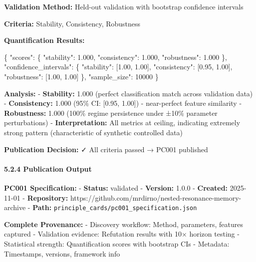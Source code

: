 \documentclass[
]{article}
\newenvironment{Shaded}{}{}
\newcommand{\DataTypeTok}[1]{\textcolor[rgb]{0.56,0.13,0.00}{#1}}
\newcommand{\DecValTok}[1]{\textcolor[rgb]{0.25,0.63,0.44}{#1}}
\newcommand{\FloatTok}[1]{\textcolor[rgb]{0.25,0.63,0.44}{#1}}
\newcommand{\FunctionTok}[1]{\textcolor[rgb]{0.02,0.16,0.49}{#1}}
\newcommand{\OtherTok}[1]{\textcolor[rgb]{0.00,0.44,0.13}{#1}}
\begin{document}
\textbf{Validation Method:} Held-out validation with bootstrap
confidence intervals

\textbf{Criteria:} Stability, Consistency, Robustness

\textbf{Quantification Results:}

\begin{Shaded}
\begin{Highlighting}[]
\FunctionTok{\{}
  \DataTypeTok{"scores"}\FunctionTok{:} \FunctionTok{\{}
    \DataTypeTok{"stability"}\FunctionTok{:} \FloatTok{1.000}\FunctionTok{,}
    \DataTypeTok{"consistency"}\FunctionTok{:} \FloatTok{1.000}\FunctionTok{,}
    \DataTypeTok{"robustness"}\FunctionTok{:} \FloatTok{1.000}
  \FunctionTok{\},}
  \DataTypeTok{"confidence\_intervals"}\FunctionTok{:} \FunctionTok{\{}
    \DataTypeTok{"stability"}\FunctionTok{:} \OtherTok{[}\FloatTok{1.00}\OtherTok{,} \FloatTok{1.00}\OtherTok{]}\FunctionTok{,}
    \DataTypeTok{"consistency"}\FunctionTok{:} \OtherTok{[}\FloatTok{0.95}\OtherTok{,} \FloatTok{1.00}\OtherTok{]}\FunctionTok{,}
    \DataTypeTok{"robustness"}\FunctionTok{:} \OtherTok{[}\FloatTok{1.00}\OtherTok{,} \FloatTok{1.00}\OtherTok{]}
  \FunctionTok{\},}
  \DataTypeTok{"sample\_size"}\FunctionTok{:} \DecValTok{10000}
\FunctionTok{\}}
\end{Highlighting}
\end{Shaded}

\textbf{Analysis:} - \textbf{Stability:} 1.000 (perfect classification
match across validation data) - \textbf{Consistency:} 1.000 (95\% CI:
{[}0.95, 1.00{]}) - near-perfect feature similarity -
\textbf{Robustness:} 1.000 (100\% regime persistence under ±10\%
parameter perturbations) - \textbf{Interpretation:} All metrics at
ceiling, indicating extremely strong pattern (characteristic of
synthetic controlled data)

\textbf{Publication Decision:} ✓ All criteria passed → PC001 published

\paragraph{5.2.4 Publication Output}\label{publication-output}

\textbf{PC001 Specification:} - \textbf{Status:} validated -
\textbf{Version:} 1.0.0 - \textbf{Created:} 2025-11-01 -
\textbf{Repository:}
https://github.com/mrdirno/nested-resonance-memory-archive -
\textbf{Path:} \texttt{principle\_cards/pc001\_specification.json}

\textbf{Complete Provenance:} - Discovery workflow: Method, parameters,
features captured - Validation evidence: Refutation results with 10×
horizon testing - Statistical strength: Quantification scores with
bootstrap CIs - Metadata: Timestamps, versions, framework info
\end{document}
